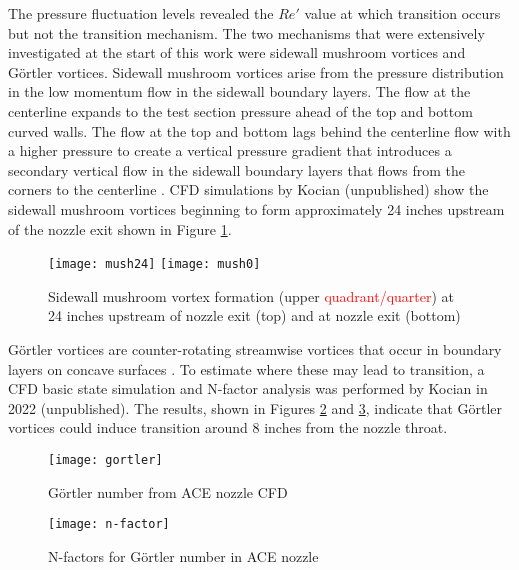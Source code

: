 The pressure fluctuation levels revealed the $Re'$ value at which transition occurs but not the transition mechanism. The two mechanisms that were extensively investigated at the start of this work were sidewall mushroom vortices and Görtler vortices. Sidewall mushroom vortices arise from the pressure distribution in the low momentum flow in the sidewall boundary layers. The flow at the centerline expands to the test section pressure ahead of the top and bottom curved walls. The flow at the top and bottom lags behind the centerline flow with a higher pressure to create a vertical pressure gradient that introduces a secondary vertical flow in the sidewall boundary layers that flows from the corners to the centerline \cite{sabnis}. CFD simulations by Kocian (unpublished) show the sidewall mushroom vortices beginning to form approximately 24 inches upstream of the nozzle exit shown in Figure \ref{fig:mushrooms}. 
\begin{figure}[ht!]
    \centering
    \texttt{[image: mush24]}
    \texttt{[image: mush0]}
    \caption{Sidewall mushroom vortex formation (upper \textcolor{red}{quadrant/quarter}) at 24 inches upstream of nozzle exit (top) and at nozzle exit (bottom) }
    \label{fig:mushrooms}
\end{figure}

Görtler vortices are counter-rotating streamwise vortices that occur in boundary layers on concave surfaces \cite{saric}. To estimate where these may lead to transition, a CFD basic state simulation and N-factor analysis was performed by Kocian in 2022 (unpublished). The results, shown in Figures \ref{fig:gortler} and \ref{fig:n-factor}, indicate that Görtler vortices could induce transition around 8 inches from the nozzle throat. 

\begin{figure}[ht!]
    \centering
    \texttt{[image: gortler]}
    \caption{Görtler number from ACE nozzle CFD}
    \label{fig:gortler}
\end{figure}

\begin{figure}[ht!]
    \centering
    \texttt{[image: n-factor]}
    \caption{N-factors for Görtler number in ACE nozzle}
    \label{fig:n-factor}
\end{figure}

